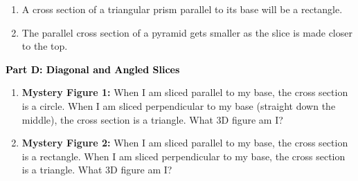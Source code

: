 \documentclass[12pt, letterpaper, fleqn]{article}
\begin{document}
\begin{enumerate}[itemsep=5.5cm, leftmargin=0.6cm, resume]
\item A cross section of a triangular prism parallel to its base will be a rectangle.
\item The parallel cross section of a pyramid gets smaller as the slice is made closer to the top.
\end{enumerate}

\newpage

\begin{tcolorbox}[colback=customteal!20]
\large\textcolor{black}{\textbf{Part D: Diagonal and Angled Slices}}
\end{tcolorbox}

\vspace{3mm}

\begin{enumerate}[itemsep=5.5cm, leftmargin=0.6cm, resume]
\item \textbf{Mystery Figure 1:} When I am sliced parallel to my base, the cross section is a circle. When I am sliced perpendicular to my base (straight down the middle), the cross section is a triangle. What 3D figure am I?
\item \textbf{Mystery Figure 2:} When I am sliced parallel to my base, the cross section is a rectangle. When I am sliced perpendicular to my base, the cross section is a triangle. What 3D figure am I?
\end{enumerate}
\end{document}
